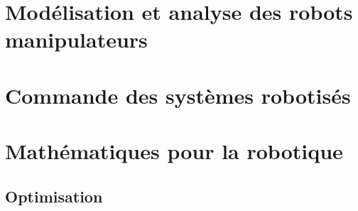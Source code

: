 \documentclass[letterpaper,oneside,french]{book}
\begin{document}


{\hypersetup{linkcolor=black}
\tableofcontents
\newpage
}


\part{Modélisation et analyse des robots manipulateurs}
\label{sec:manip}









\part{Commande des systèmes robotisés}
\label{sec:control}












\part{Mathématiques pour la robotique}



\chapter{Optimisation}
\end{document}
